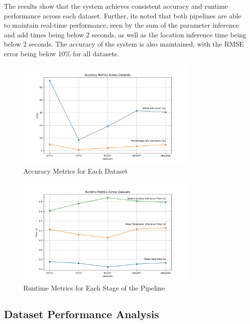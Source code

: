 The results show that the system achieves consistent accuracy and runtime performance across each dataset. Further, its noted that both pipelines are able to maintain real-time performance, seen by the sum of the parameter inference and add times being below 2 seconds, as well as the location inference time being below 2 seconds. The accuracy of the system is also maintained, with the RMSE error being below 10\% for all datasets.


\begin{figure}[H]
    \centering
    \includegraphics[width=0.8\textwidth]{Chapter 5/RESULTPLOTS/key metrics/Accuracy Datasets.png}
    \caption{Accuracy Metrics for Each Dataset}
    \label{fig:Per Dataset Metrics}
\end{figure}


\begin{figure}[H]
    \centering
    \includegraphics[width=0.8\textwidth]{Chapter 5/RESULTPLOTS/key metrics/Runtime Datasets.png}
    \caption{Runtime Metrics for Each Stage of the Pipeline}
    \label{fig: Dataset Metrics}
\end{figure}

\subsection{Dataset Performance Analysis}

